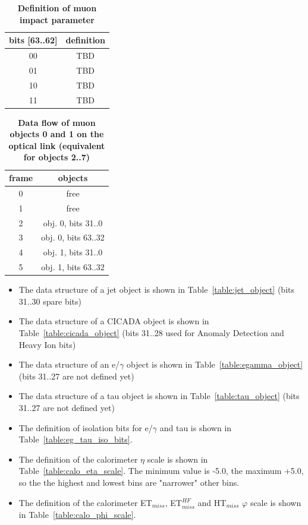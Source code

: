 \documentclass{cmspaper}
\begin{document}
\begin{table}[ht]
\caption{\bf Definition of muon impact parameter}
\vspace{5mm}
\centering
\begin{tabular}{|c|c|}\hline
bits [63..62] & definition \\\hline\hline
00 & TBD \\
01 & TBD \\
10 & TBD \\
11 & TBD \\\hline
\end{tabular}
\label{table:muon_iso_bits}
\end{table}

\begin{table}[ht]
\caption{\bf Data flow of muon objects 0 and 1 on the optical link \rm(equivalent for objects 2..7)}
\vspace{5mm}
\centering
\begin{tabular}{|c|c|}\hline
frame & objects\\\hline\hline
0 & free \\\hline
1 & free \\\hline
2 & obj. 0, bits 31..0\\\hline
3 & obj. 0, bits 63..32 \\\hline
4 & obj. 1, bits 31..0 \\\hline
5 & obj. 1, bits 63..32 \\\hline
\end{tabular}
\label{table:opt_link_muon_obj_0_1}
\end{table}

\clearpage

\begin{itemize}
\item The data structure of a jet object is shown in Table~\ref{table:jet_object} (bits 31..30 spare bits)
\item The data structure of a CICADA object is shown in Table~\ref{table:cicada_object} (bits 31..28 used for Anomaly Detection and Heavy Ion bits)
\item The data structure of an e/$\gamma$ object is shown in Table~\ref{table:egamma_object} (bits 31..27 are not defined yet)
\item The data structure of a tau object is shown in Table~\ref{table:tau_object} (bits 31..27 are not defined yet)
\item The definition of isolation bits for e/$\gamma$ and tau is shown in Table~\ref{table:eg_tau_iso_bits}.
\item The definition of the calorimeter $\eta$ scale is shown in Table~\ref{table:calo_eta_scale}. The minimum value is -5.0, the maximum +5.0, so the the highest and lowest
bins are "narrower" other bins.
\item The definition of the calorimeter ET$_{miss}$, ET$_{miss}^{HF}$ and HT$_{miss}$ $\varphi$ scale is shown in Table~\ref{table:calo_phi_scale}.
\end{itemize}
\end{document}
